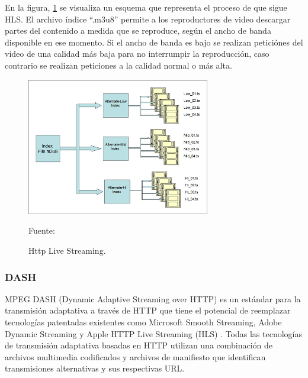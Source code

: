 En la figura, \ref{fig:hls} se visualiza un esquema que representa el proceso de que sigue HLS. El archivo índice ``.m3u8'' permite a los reproductores de video descargar partes del contenido a medida que se reproduce, según el ancho de banda disponible en ese momento. Si el ancho de banda es bajo se realizan peticiónes del video de una calidad más baja para no interrumpir la reproducción, caso contrario se realizan peticiones a la calidad normal o más alta.
\begin{figure}[H]
    \begin{center}
        \includegraphics[width=8cm]{img/capitulo_2/hls.jpg}
    \end{center}
    \begin{center}
        \caption{Http Live Streaming.}
        Fuente: \cite{hls}
        \label{fig:hls}
    \end{center}
\end{figure}

\subsubsection{DASH}

MPEG DASH (Dynamic Adaptive Streaming over HTTP) es un estándar para la transmisión adaptativa a través de HTTP que tiene el potencial de reemplazar tecnologías patentadas existentes como Microsoft Smooth Streaming, Adobe Dynamic Streaming y Apple HTTP Live Streaming (HLS) \cite{dash_streamingmedia}. Todas las tecnologías de transmisión adaptativa basadas en HTTP utilizan una combinación de archivos multimedia codificados y archivos de manifiesto que identifican transmisiones alternativas y sus respectivas URL.\\

